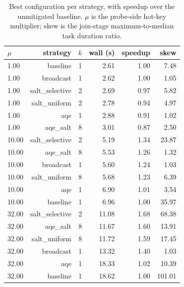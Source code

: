 \begin{table}[t]
\centering
\caption{Best configuration per strategy, with speedup over the unmitigated baseline. $\mu$ is the probe-side hot-key multiplier; skew is the join-stage maximum-to-median task duration ratio.}
\label{tab:headline}
\footnotesize
\begin{tabular}{lrrrrr}
\toprule
$\mu$ & strategy & $k$ & wall (s) & speedup & skew \\
\midrule
1.00 & baseline & 1 & 2.61 & 1.00 & 7.48 \\
1.00 & broadcast & 1 & 2.62 & 1.00 & 1.05 \\
1.00 & salt\_selective & 2 & 2.69 & 0.97 & 5.82 \\
1.00 & salt\_uniform & 2 & 2.78 & 0.94 & 4.97 \\
1.00 & aqe & 1 & 2.88 & 0.91 & 1.02 \\
1.00 & aqe\_salt & 8 & 3.01 & 0.87 & 2.50 \\
10.00 & salt\_selective & 2 & 5.19 & 1.34 & 23.87 \\
10.00 & aqe\_salt & 8 & 5.53 & 1.26 & 1.32 \\
10.00 & broadcast & 1 & 5.60 & 1.24 & 1.03 \\
10.00 & salt\_uniform & 8 & 5.68 & 1.23 & 6.39 \\
10.00 & aqe & 1 & 6.90 & 1.01 & 3.54 \\
10.00 & baseline & 1 & 6.96 & 1.00 & 35.97 \\
32.00 & salt\_selective & 2 & 11.08 & 1.68 & 68.38 \\
32.00 & aqe\_salt & 8 & 11.67 & 1.60 & 13.91 \\
32.00 & salt\_uniform & 8 & 11.72 & 1.59 & 17.45 \\
32.00 & broadcast & 1 & 13.32 & 1.40 & 1.03 \\
32.00 & aqe & 1 & 18.33 & 1.02 & 10.39 \\
32.00 & baseline & 1 & 18.62 & 1.00 & 101.01 \\
\bottomrule
\end{tabular}
\end{table}
